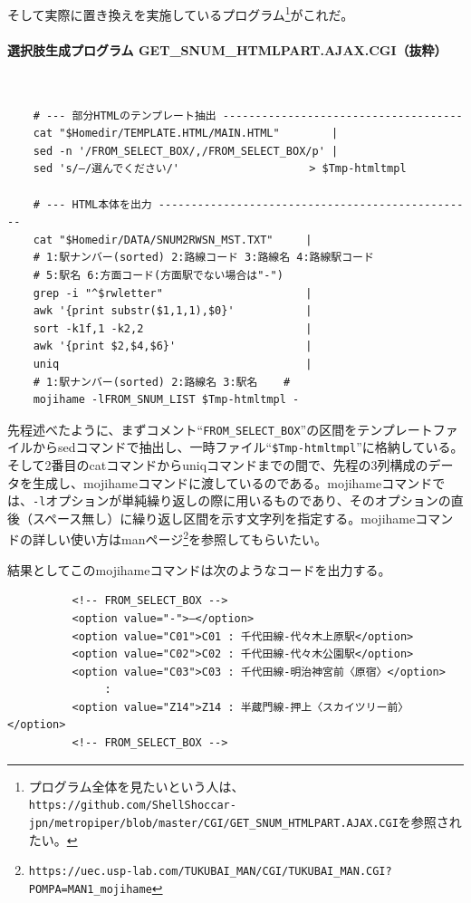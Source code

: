 そして実際に置き換えを実施しているプログラム\footnote{プログラム全体を見たいという人は、\\ \verb|https://github.com/ShellShoccar-jpn/metropiper/blob/master/CGI/GET_SNUM_HTMLPART.AJAX.CGI|を参照されたい。}がこれだ。

\paragraph*{選択肢生成プログラム GET\_{}SNUM\_{}HTMLPART.AJAX.CGI（抜粋）} 　\\
\begin{frameboxit}{160.0mm}
\begin{verbatim}
	# --- 部分HTMLのテンプレート抽出 -------------------------------------
	cat "$Homedir/TEMPLATE.HTML/MAIN.HTML"        |
	sed -n '/FROM_SELECT_BOX/,/FROM_SELECT_BOX/p' |
	sed 's/―/選んでください/'                    > $Tmp-htmltmpl
	
	# --- HTML本体を出力 -------------------------------------------------
	cat "$Homedir/DATA/SNUM2RWSN_MST.TXT"     |
	# 1:駅ナンバー(sorted) 2:路線コード 3:路線名 4:路線駅コード
	# 5:駅名 6:方面コード(方面駅でない場合は"-")
	grep -i "^$rwletter"                      |
	awk '{print substr($1,1,1),$0}'           |
	sort -k1f,1 -k2,2                         |
	awk '{print $2,$4,$6}'                    |
	uniq                                      |
	# 1:駅ナンバー(sorted) 2:路線名 3:駅名    #
	mojihame -lFROM_SNUM_LIST $Tmp-htmltmpl -
\end{verbatim}
\end{frameboxit}

先程述べたように、まずコメント``\verb|FROM_SELECT_BOX|''の区間をテンプレートファイルからsedコマンドで抽出し、一時ファイル``\verb|$Tmp-htmltmpl|''に格納している。そして2番目のcatコマンドからuniqコマンドまでの間で、先程の3列構成のデータを生成し、mojihameコマンドに渡しているのである。mojihameコマンドでは、\verb|-l|オプションが単純繰り返しの際に用いるものであり、そのオプションの直後（スペース無し）に繰り返し区間を示す文字列を指定する。mojihameコマンドの詳しい使い方はmanページ\footnote{\verb|https://uec.usp-lab.com/TUKUBAI_MAN/CGI/TUKUBAI_MAN.CGI?POMPA=MAN1_mojihame|}を参照してもらいたい。

結果としてこのmojihameコマンドは次のようなコードを出力する。\\
\begin{frameboxit}{160.0mm}
\begin{verbatim}
	      <!-- FROM_SELECT_BOX -->
	      <option value="-">―</option>
	      <option value="C01">C01 : 千代田線-代々木上原駅</option>
	      <option value="C02">C02 : 千代田線-代々木公園駅</option>
	      <option value="C03">C03 : 千代田線-明治神宮前〈原宿〉</option>
	           :
	      <option value="Z14">Z14 : 半蔵門線-押上〈スカイツリー前〉</option>
	      <!-- FROM_SELECT_BOX -->
\end{verbatim}
\end{frameboxit}

